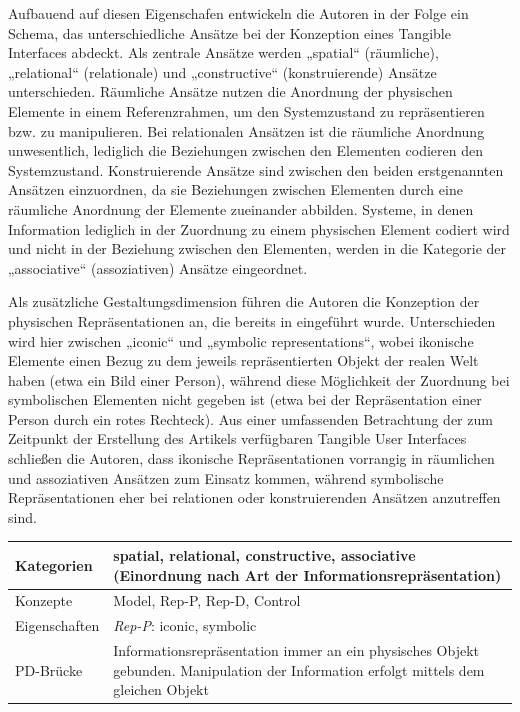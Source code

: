 Aufbauend auf diesen Eigenschafen entwickeln die Autoren in der Folge ein Schema, das unterschiedliche Ansätze bei der Konzeption eines Tangible Interfaces abdeckt. Als zentrale Ansätze werden „spatial“ (räumliche), „relational“ (relationale) und „constructive“ (konstruierende) Ansätze unterschieden. Räumliche Ansätze nutzen die Anordnung der physischen Elemente in einem Referenzrahmen, um den Systemzustand zu repräsentieren bzw. zu manipulieren. Bei relationalen Ansätzen ist die räumliche Anordnung unwesentlich, lediglich die Beziehungen zwischen den Elementen codieren den Systemzustand. Konstruierende Ansätze sind zwischen den beiden erstgenannten Ansätzen einzuordnen, da sie Beziehungen zwischen Elementen durch eine räumliche Anordnung der Elemente zueinander abbilden. Systeme, in denen Information lediglich in der Zuordnung zu einem physischen Element codiert wird und nicht in der Beziehung zwischen den Elementen, werden in die Kategorie der „associative“ (assoziativen) Ansätze eingeordnet.

Als zusätzliche Gestaltungsdimension führen die Autoren die Konzeption der physischen Repräsentationen an, die bereits in \citep{Ullmer97} eingeführt wurde. Unterschieden wird hier zwischen „iconic“ und „symbolic representations“, wobei ikonische Elemente einen Bezug zu dem jeweils repräsentierten Objekt der realen Welt haben (etwa ein Bild einer Person), während diese Möglichkeit der Zuordnung bei symbolischen Elementen nicht gegeben ist (etwa bei der Repräsentation einer Person durch ein rotes Rechteck). Aus einer umfassenden Betrachtung der zum Zeitpunkt der Erstellung des Artikels verfügbaren Tangible User Interfaces schließen die Autoren, dass ikonische Repräsentationen vorrangig in räumlichen und assoziativen Ansätzen zum Einsatz kommen, während symbolische Repräsentationen eher bei relationen oder konstruierenden Ansätzen anzutreffen sind.

\begin{tabular}{| p{3cm} | p{10cm} |}
  \hline
  Kategorien & spatial, relational, constructive, associative (Einordnung nach Art der Informationsrepräsentation)  \\ \hline
  Konzepte & Model, Rep-P, Rep-D, Control \\ \hline
  Eigenschaften & \emph{Rep-P}: iconic, symbolic \\ \hline
  PD-Brücke & Informationsrepräsentation immer an ein physisches Objekt gebunden. Manipulation der Information erfolgt mittels dem gleichen Objekt \\ \hline
\end{tabular} 

